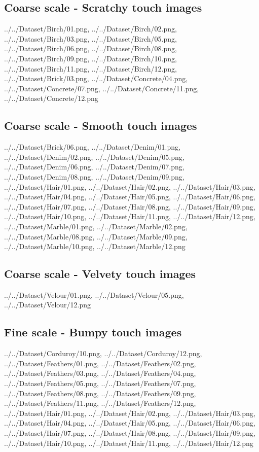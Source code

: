 \newpage
\subsection{Coarse scale - Scratchy touch images}
{../../Dataset/Birch/01.png,
../../Dataset/Birch/02.png,
../../Dataset/Birch/03.png,
../../Dataset/Birch/05.png,
../../Dataset/Birch/06.png,
../../Dataset/Birch/08.png,
../../Dataset/Birch/09.png,
../../Dataset/Birch/10.png,
../../Dataset/Birch/11.png,
../../Dataset/Birch/12.png,
../../Dataset/Brick/03.png,
../../Dataset/Concrete/04.png,
../../Dataset/Concrete/07.png,
../../Dataset/Concrete/11.png,
../../Dataset/Concrete/12.png}

\newpage
\subsection{Coarse scale - Smooth touch images}
{../../Dataset/Brick/06.png,
../../Dataset/Denim/01.png,
../../Dataset/Denim/02.png,
../../Dataset/Denim/05.png,
../../Dataset/Denim/06.png,
../../Dataset/Denim/07.png,
../../Dataset/Denim/08.png,
../../Dataset/Denim/09.png,
../../Dataset/Hair/01.png,
../../Dataset/Hair/02.png,
../../Dataset/Hair/03.png,
../../Dataset/Hair/04.png,
../../Dataset/Hair/05.png,
../../Dataset/Hair/06.png,
../../Dataset/Hair/07.png,
../../Dataset/Hair/08.png,
../../Dataset/Hair/09.png,
../../Dataset/Hair/10.png,
../../Dataset/Hair/11.png,
../../Dataset/Hair/12.png,
../../Dataset/Marble/01.png,
../../Dataset/Marble/02.png,
../../Dataset/Marble/08.png,
../../Dataset/Marble/09.png,
../../Dataset/Marble/10.png,
../../Dataset/Marble/12.png}

\newpage
\subsection{Coarse scale - Velvety touch images}
{../../Dataset/Velour/01.png,
../../Dataset/Velour/05.png,
../../Dataset/Velour/12.png}

\newpage
\subsection{Fine scale - Bumpy touch images}
{../../Dataset/Corduroy/10.png,
../../Dataset/Corduroy/12.png,
../../Dataset/Feathers/01.png,
../../Dataset/Feathers/02.png,
../../Dataset/Feathers/03.png,
../../Dataset/Feathers/04.png,
../../Dataset/Feathers/05.png,
../../Dataset/Feathers/07.png,
../../Dataset/Feathers/08.png,
../../Dataset/Feathers/09.png,
../../Dataset/Feathers/11.png,
../../Dataset/Feathers/12.png,
../../Dataset/Hair/01.png,
../../Dataset/Hair/02.png,
../../Dataset/Hair/03.png,
../../Dataset/Hair/04.png,
../../Dataset/Hair/05.png,
../../Dataset/Hair/06.png,
../../Dataset/Hair/07.png,
../../Dataset/Hair/08.png,
../../Dataset/Hair/09.png,
../../Dataset/Hair/10.png,
../../Dataset/Hair/11.png,
../../Dataset/Hair/12.png}

